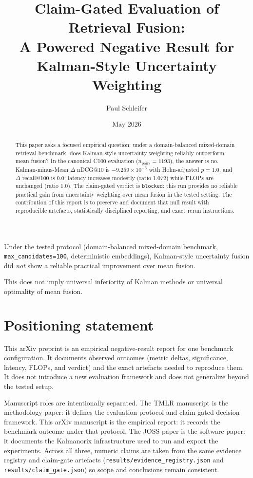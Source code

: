 \documentclass[11pt]{article}
\title{Claim-Gated Evaluation of Retrieval Fusion:\\
A Powered Negative Result for Kalman-Style Uncertainty Weighting}
\author{Paul Schleifer}
\date{May 2026}
\begin{document}
\maketitle

\begin{abstract}
This paper asks a focused empirical question: under a domain-balanced mixed-domain retrieval benchmark, does Kalman-style uncertainty weighting reliably outperform mean fusion? In the canonical C100 evaluation ($n_{\text{pairs}}=1193$), the answer is no. Kalman-minus-Mean $\Delta$ nDCG@10 is $-9.259\times10^{-6}$ with Holm-adjusted $p=1.0$, and $\Delta$ recall@100 is 0.0; latency increases modestly (ratio 1.072) while FLOPs are unchanged (ratio 1.0). The claim-gated verdict is \texttt{blocked}: this run provides no reliable practical gain from uncertainty weighting over mean fusion in the tested setting. The contribution of this report is to preserve and document that null result with reproducible artefacts, statistically disciplined reporting, and exact rerun instructions.
\end{abstract}

\begin{tcolorbox}[colback=gray!8,colframe=black,title=Scope of conclusion]
Under the tested protocol (domain-balanced mixed-domain benchmark, \texttt{max\_candidates=100}, deterministic embeddings), Kalman-style uncertainty fusion did \emph{not} show a reliable practical improvement over mean fusion.

This does not imply universal inferiority of Kalman methods or universal optimality of mean fusion.
\end{tcolorbox}

\section{Positioning statement}
This arXiv preprint is an empirical negative-result report for one benchmark configuration. It documents observed outcomes (metric deltas, significance, latency, FLOPs, and verdict) and the exact artefacts needed to reproduce them. It does not introduce a new evaluation framework and does not generalize beyond the tested setup.

Manuscript roles are intentionally separated. The TMLR manuscript is the methodology paper: it defines the evaluation protocol and claim-gated decision framework. This arXiv manuscript is the empirical report: it records the benchmark outcome under that protocol. The JOSS paper is the software paper: it documents the Kalmanorix infrastructure used to run and export the experiments. Across all three, numeric claims are taken from the same evidence registry and claim-gate artefacts (\texttt{results/evidence\_registry.json} and \texttt{results/claim\_gate.json}) so scope and conclusions remain consistent.
\end{document}
